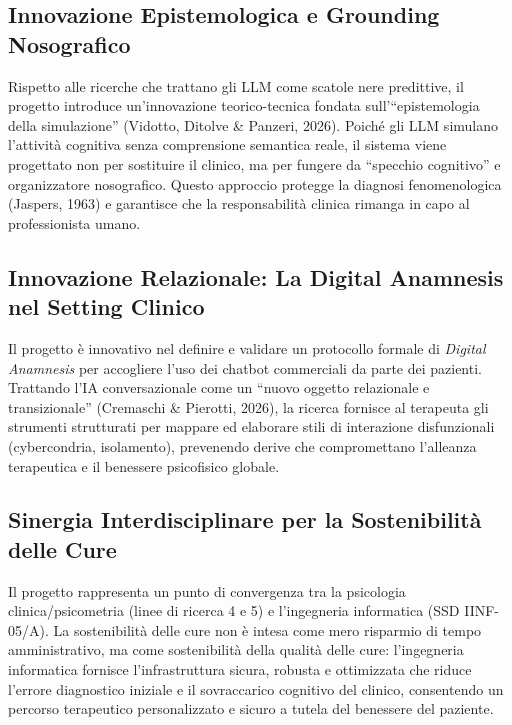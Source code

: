 \documentclass[11pt,a4paper]{article}
\begin{document}
\subsection{Innovazione Epistemologica e Grounding Nosografico}
Rispetto alle ricerche che trattano gli LLM come scatole nere predittive, il progetto introduce un'innovazione teorico-tecnica fondata sull'``epistemologia della simulazione'' (Vidotto, Ditolve \& Panzeri, 2026). Poiché gli LLM simulano l'attività cognitiva senza comprensione semantica reale, il sistema viene progettato non per sostituire il clinico, ma per fungere da ``specchio cognitivo'' e organizzatore nosografico. Questo approccio protegge la diagnosi fenomenologica (Jaspers, 1963) e garantisce che la responsabilità clinica rimanga in capo al professionista umano.

\subsection{Innovazione Relazionale: La Digital Anamnesis nel Setting Clinico}
Il progetto è innovativo nel definire e validare un protocollo formale di \textit{Digital Anamnesis} per accogliere l'uso dei chatbot commerciali da parte dei pazienti. Trattando l'IA conversazionale come un ``nuovo oggetto relazionale e transizionale'' (Cremaschi \& Pierotti, 2026), la ricerca fornisce al terapeuta gli strumenti strutturati per mappare ed elaborare stili di interazione disfunzionali (cybercondria, isolamento), prevenendo derive che compromettano l'alleanza terapeutica e il benessere psicofisico globale.

\subsection{Sinergia Interdisciplinare per la Sostenibilità delle Cure}
Il progetto rappresenta un punto di convergenza tra la psicologia clinica/psicometria (linee di ricerca 4 e 5) e l'ingegneria informatica (SSD IINF-05/A). La sostenibilità delle cure non è intesa come mero risparmio di tempo amministrativo, ma come sostenibilità della qualità delle cure: l'ingegneria informatica fornisce l'infrastruttura sicura, robusta e ottimizzata che riduce l'errore diagnostico iniziale e il sovraccarico cognitivo del clinico, consentendo un percorso terapeutico personalizzato e sicuro a tutela del benessere del paziente.

\end{document}

